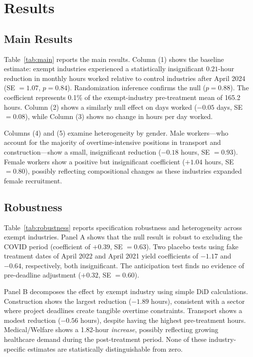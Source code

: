 \documentclass[12pt]{article}
\begin{document}
\section{Results}

\subsection{Main Results}



Table~\ref{tab:main} reports the main results. Column (1) shows the baseline estimate: exempt industries experienced a statistically insignificant $0.21$-hour reduction in monthly hours worked relative to control industries after April 2024 (SE $= 1.07$, $p = 0.84$). Randomization inference confirms the null ($p = 0.88$). The coefficient represents 0.1\% of the exempt-industry pre-treatment mean of 165.2 hours. Column (2) shows a similarly null effect on days worked ($-0.05$ days, SE $= 0.08$), while Column (3) shows no change in hours per day worked.

Columns (4) and (5) examine heterogeneity by gender. Male workers---who account for the majority of overtime-intensive positions in transport and construction---show a small, insignificant reduction ($-0.18$ hours, SE $= 0.93$). Female workers show a positive but insignificant coefficient ($+1.04$ hours, SE $= 0.80$), possibly reflecting compositional changes as these industries expanded female recruitment.

\subsection{Robustness}



Table~\ref{tab:robustness} reports specification robustness and heterogeneity across exempt industries. Panel A shows that the null result is robust to excluding the COVID period (coefficient of $+0.39$, SE $= 0.63$). Two placebo tests using fake treatment dates of April 2022 and April 2021 yield coefficients of $-1.17$ and $-0.64$, respectively, both insignificant. The anticipation test finds no evidence of pre-deadline adjustment ($+0.32$, SE $= 0.60$).

Panel B decomposes the effect by exempt industry using simple DiD calculations. Construction shows the largest reduction ($-1.89$ hours), consistent with a sector where project deadlines create tangible overtime constraints. Transport shows a modest reduction ($-0.56$ hours), despite having the highest pre-treatment hours. Medical/Welfare shows a 1.82-hour \textit{increase}, possibly reflecting growing healthcare demand during the post-treatment period. None of these industry-specific estimates are statistically distinguishable from zero.
\end{document}
